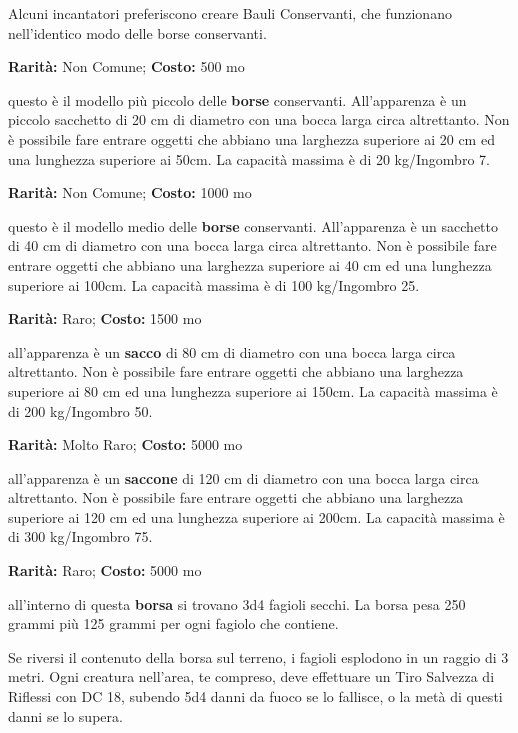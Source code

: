 \begin{multicols}{2}
Alcuni incantatori preferiscono creare Bauli Conservanti, che funzionano nell'identico modo delle borse conservanti.


\textbf{Rarità:} Non Comune; \textbf{Costo:} 500 mo

questo è il modello più piccolo delle \textbf{borse} conservanti. All'apparenza è un piccolo sacchetto di 20 cm di diametro con una bocca larga circa altrettanto.
Non è possibile fare entrare oggetti che abbiano una larghezza superiore ai 20 cm ed una lunghezza superiore ai 50cm.
La capacità massima è di 20 kg/Ingombro 7.


\textbf{Rarità:} Non Comune; \textbf{Costo:} 1000 mo

questo è il modello medio delle \textbf{borse} conservanti. All'apparenza è un sacchetto di 40 cm di diametro con una bocca larga circa altrettanto.
Non è possibile fare entrare oggetti che abbiano una larghezza superiore ai 40 cm ed una lunghezza superiore ai 100cm.
La capacità massima è di 100 kg/Ingombro 25.


\textbf{Rarità:} Raro; \textbf{Costo:} 1500 mo

all'apparenza è un \textbf{sacco} di 80 cm di diametro con una bocca larga circa altrettanto.
Non è possibile fare entrare oggetti che abbiano una larghezza superiore ai 80 cm ed una lunghezza superiore ai 150cm. La capacità massima è di 200 kg/Ingombro 50.


\textbf{Rarità:} Molto Raro; \textbf{Costo:} 5000 mo

all'apparenza è un \textbf{saccone} di 120 cm di diametro con una bocca larga circa altrettanto.
Non è possibile fare entrare oggetti che abbiano una larghezza superiore ai 120 cm ed una lunghezza superiore ai 200cm. La capacità massima è di 300 kg/Ingombro 75.


\textbf{Rarità:} Raro; \textbf{Costo:} 5000 mo

all'interno di questa \textbf{borsa} si trovano 3d4 fagioli secchi. La borsa pesa 250 grammi più 125 grammi per ogni fagiolo che contiene.

Se riversi il contenuto della borsa sul terreno, i fagioli esplodono in un raggio di 3 metri. Ogni creatura nell'area, te compreso, deve effettuare un Tiro Salvezza di Riflessi con DC 18, subendo 5d4 danni da fuoco se lo fallisce, o la metà di questi danni se lo supera.


\end{multicols}
